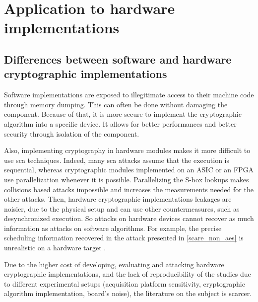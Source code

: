 \documentclass[11pt]{sdm}
\begin{document}



\section{Application to hardware implementations}

\subsection{Differences between software and hardware cryptographic implementations}

Software implementations are exposed to illegitimate access to their machine code through memory dumping.
This can often be done without damaging the component.
Because of that, it is more secure to implement the cryptographic algorithm into a specific device.
It allows for better performances and better security through isolation of the component.

Also, implementing cryptography in hardware modules makes it more difficult to use \gls{sca} techniques.
Indeed, many \gls{sca} attacks assume that the execution is sequential, whereas cryptographic modules implemented on an ASIC or an FPGA use parallelization whenever it is possible.
Parallelizing the S-box lookups makes collisions based attacks impossible and increases the measurements needed for the other attacks.
Then, hardware cryptographic implementations leakages are noisier, due to the physical setup and can use other countermeasures, such as desynchronized execution.
So attacks on hardware devices cannot recover as much information as attacks on software algorithms.
For example, the precise scheduling information recovered in the attack presented in \ref{scare_non_aes} is unrealistic on a hardware target \parencite{Daudigny_Ledig_Muller_Valette_2005}.


Due to the higher cost of developing, evaluating and attacking hardware cryptographic implementations, and the lack of reproducibility of the studies due to different experimental setups (acquisition platform sensitivity, cryptographic algorithm implementation, board's noise), the literature on the subject is scarcer.
\end{document}
